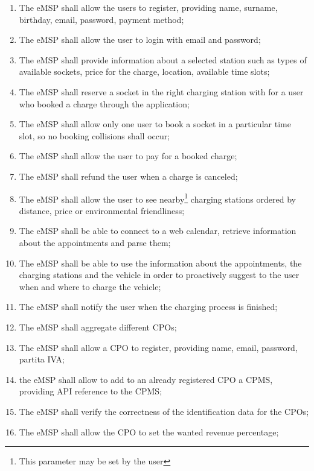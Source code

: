 \begin{enumerate}[label=\textbf{R\arabic*}]
    \item The \ac{eMSP} shall allow the users to register, providing name, surname, birthday, email, password, payment method;
    \item The \ac{eMSP} shall allow the user to login with email and password;
    \item The \ac{eMSP} shall provide information about a selected station such as types of available sockets, price for the charge, location, available time slots;
    \item The \ac{eMSP} shall reserve a socket in the right charging station with for a user who booked a charge through the application;
    \item The \ac{eMSP} shall allow only one user to book a socket in a particular time slot, so no booking collisions shall occur;
    \item The \ac{eMSP} shall allow the user to pay for a booked charge;
    \item The \ac{eMSP} shall refund the user when a charge is canceled;
    \item The \ac{eMSP} shall allow the user to see nearby\footnote{This parameter may be set by the user} charging stations ordered by distance, price or environmental friendliness;
    \item The \ac{eMSP} shall be able to connect to a web calendar, retrieve information about the appointments and parse them;
    \item The \ac{eMSP} shall be able to use the information about the appointments, the charging stations and the vehicle in order to proactively suggest to the user when and where to charge the vehicle;
    \item The \ac{eMSP} shall notify the user when the charging process is finished;
    \item The \ac{eMSP} shall aggregate different \acp{CPO};
    \item The \ac{eMSP} shall allow a \ac{CPO} to register, providing name, email, password, \gls{partita IVA};
    \item the \ac{eMSP} shall allow to add to an already registered \ac{CPO} a \ac{CPMS}, providing \ac{API} reference to the \ac{CPMS};
    \item The \ac{eMSP} shall verify the correctness of the identification data for the \acp{CPO};
    \item The \ac{eMSP} shall allow the \ac{CPO} to set the wanted revenue percentage;

\end{enumerate}
